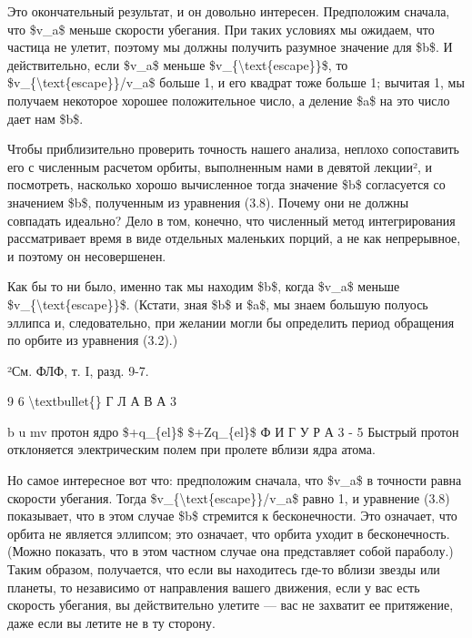 \documentclass[10pt,oneside]{article}
\begin{document}
Это окончательный результат, и он довольно интересен. Предположим сначала, что \$v\_a\$ меньше скорости убегания. При таких условиях мы ожидаем, что частица не улетит, поэтому мы должны получить разумное значение для \$b\$. И действительно, если \$v\_a\$ меньше \$v\_\{\textbackslash{}text\{escape\}\}\$, то \$v\_\{\textbackslash{}text\{escape\}\}/v\_a\$ больше 1, и его квадрат тоже больше 1; вычитая 1, мы получаем некоторое хорошее положительное число, а деление \$a\$ на это число дает нам \$b\$.\par

Чтобы приблизительно проверить точность нашего анализа, неплохо сопоставить его с численным расчетом орбиты, выполненным нами в девятой лекции², и посмотреть, насколько хорошо вычисленное тогда значение \$b\$ согласуется со значением \$b\$, полученным из уравнения (3.8). Почему они не должны совпадать идеально? Дело в том, конечно, что численный метод интегрирования рассматривает время в виде отдельных маленьких порций, а не как непрерывное, и поэтому он несовершенен.\par

Как бы то ни было, именно так мы находим \$b\$, когда \$v\_a\$ меньше \$v\_\{\textbackslash{}text\{escape\}\}\$. (Кстати, зная \$b\$ и \$a\$, мы знаем большую полуось эллипса и, следовательно, при желании могли бы определить период обращения по орбите из уравнения (3.2).)\par

²См. ФЛФ, т. I, разд. 9-7.\par

9 6 \textbackslash{}textbullet\{\} Г Л А В А  3\par

b u mv протон ядро \$+q\_\{el\}\$ \$+Zq\_\{el\}\$ Ф И Г У Р А  3 - 5 Быстрый протон отклоняется электрическим полем при пролете вблизи ядра атома.\par

Но самое интересное вот что: предположим сначала, что \$v\_a\$ в точности равна скорости убегания. Тогда \$v\_\{\textbackslash{}text\{escape\}\}/v\_a\$ равно 1, и уравнение (3.8) показывает, что в этом случае \$b\$ стремится к бесконечности. Это означает, что орбита не является эллипсом; это означает, что орбита уходит в бесконечность. (Можно показать, что в этом частном случае она представляет собой параболу.) Таким образом, получается, что если вы находитесь где-то вблизи звезды или планеты, то независимо от направления вашего движения, если у вас есть скорость убегания, вы действительно улетите --- вас не захватит ее притяжение, даже если вы летите не в ту сторону.\par
\end{document}
